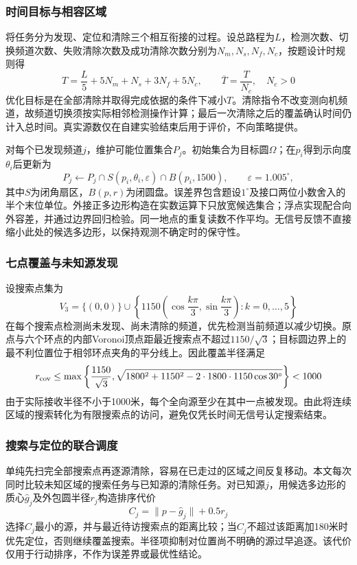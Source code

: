 \documentclass{JXUSTmodeling}
\begin{document}
\subsubsection{时间目标与相容区域}
将任务分为发现、定位和清除三个相互衔接的过程。设总路程为$L$，检测次数、切换频道次数、失败清除次数及成功清除次数分别为$N_m,N_s,N_f,N_c$，按题设计时规则得
\begin{equation}
 T=\frac{L}{5}+5N_m+N_s+3N_f+5N_c,
 \qquad \overline T=\frac{T}{N_c},\quad N_c>0
 \label{eq:search-time}
\end{equation}
优化目标是在全部清除并取得完成依据的条件下减小$T$。清除指令不改变测向机频道，故频道切换须按实际相邻检测操作计算；最后一次清除之后的覆盖确认时间仍计入总时间。真实源数仅在自建实验结束后用于评价，不向策略提供。

对每个已发现频道$j$，维护可能位置集合$P_j$。初始集合为目标圆$\Omega$；在$p_i$得到示向度$\theta_i$后更新为
\begin{equation}
 P_j\leftarrow P_j\cap S(p_i,\theta_i,\varepsilon)
          \cap B(p_i,1500),\qquad \varepsilon=1.005^\circ,
 \label{eq:search-region}
\end{equation}
其中$S$为闭角扇区，$B(p,r)$为闭圆盘。误差界包含题设$1^\circ$及接口两位小数舍入的半个末位单位。外接正多边形构造在实数运算下只放宽候选集合；浮点实现配合向外容差，并通过边界回归检验。同一地点的重复读数不作平均。无信号反馈不直接缩小此处的候选多边形，以保持观测不确定时的保守性。

\subsubsection{七点覆盖与未知源发现}
设搜索点集为
\begin{equation}
 V_3=\{(0,0)\}\cup\left\{1150
 \left(\cos\frac{k\pi}{3},\sin\frac{k\pi}{3}\right):k=0,\ldots,5\right\}
 \label{eq:p3-points}
\end{equation}
在每个搜索点检测尚未发现、尚未清除的频道，优先检测当前频道以减少切换。原点与六个环点的内部Voronoi顶点距最近搜索点不超过$1150/\sqrt3$；目标圆边界上的最不利位置位于相邻环点夹角的平分线上。因此覆盖半径满足
\begin{equation}
 r_{\rm cov}\le\max\left\{\frac{1150}{\sqrt3},
 \sqrt{1800^2+1150^2-2\cdot1800\cdot1150\cos30^\circ}\right\}<1000
 \label{eq:p3-cover}
\end{equation}
由于实际接收半径不小于1000米，每个全向源至少在其中一点被发现。由此将连续区域的搜索转化为有限搜索点的访问，避免仅凭长时间无信号认定搜索结束。

\subsubsection{搜索与定位的联合调度}
单纯先扫完全部搜索点再逐源清除，容易在已走过的区域之间反复移动。本文每次同时比较未知区域的搜索任务与已知源的清除任务。对已知源$j$，用候选多边形的质心$\widehat g_j$及外包圆半径$r_j$构造排序代价
\begin{equation}
 C_j=\|p-\widehat g_j\|+0.5r_j
 \label{eq:p3-cost}
\end{equation}
选择$C_j$最小的源，并与最近待访搜索点的距离比较；当$C_j$不超过该距离加180米时优先定位，否则继续覆盖搜索。半径项抑制对位置尚不明确的源过早追逐。该代价仅用于行动排序，不作为误差界或最优性结论。
\end{document}
